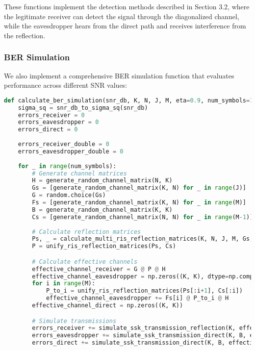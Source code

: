 These functions implement the detection methods described in Section 3.2, where the legitimate receiver can detect the signal through the diagonalized channel, while the eavesdropper hears from the direct path and receives interference from the reflection.

\subsubsection{BER Simulation}

We also implement a comprehensive BER simulation function that evaluates performance across different SNR values:

\begin{lstlisting}[language=python, caption={BER Simulation}]
def calculate_ber_simulation(snr_db, K, N, J, M, eta=0.9, num_symbols=10000):
    sigma_sq = snr_db_to_sigma_sq(snr_db)
    errors_receiver = 0
    errors_eavesdropper = 0
    errors_direct = 0
    
    errors_receiver_double = 0
    errors_eavesdropper_double = 0
    
    for _ in range(num_symbols):
        # Generate channel matrices
        H = generate_random_channel_matrix(N, K)
        Gs = [generate_random_channel_matrix(K, N) for _ in range(J)]
        G = random.choice(Gs)
        Fs = [generate_random_channel_matrix(K, N) for _ in range(M)]
        B = generate_random_channel_matrix(K, K)
        Cs = [generate_random_channel_matrix(N, N) for _ in range(M-1)]
        
        # Calculate reflection matrices
        Ps, _ = calculate_multi_ris_reflection_matrices(K, N, J, M, Gs, H, eta, Cs)
        P = unify_ris_reflection_matrices(Ps, Cs)

        # Calculate effective channels
        effective_channel_receiver = G @ P @ H
        effective_channel_eavesdropper = np.zeros((K, K), dtype=np.complex128)
        for i in range(M):
            P_to_i = unify_ris_reflection_matrices(Ps[:i+1], Cs[:i])
            effective_channel_eavesdropper += Fs[i] @ P_to_i @ H
        effective_channel_direct = np.zeros((K, K))

        # Simulate transmissions
        errors_receiver += simulate_ssk_transmission_reflection(K, effective_channel_receiver, sigma_sq)
        errors_eavesdropper += simulate_ssk_transmission_direct(K, B, effective_channel_eavesdropper, sigma_sq)
        errors_direct += simulate_ssk_transmission_direct(K, B, effective_channel_direct, sigma_sq)
        

\end{lstlisting}
